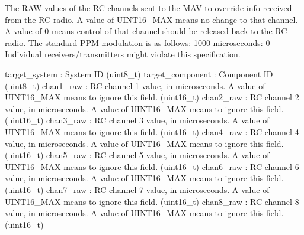 \begin{DoxyVerb}
\begin{DoxyVerb}
\begin{DoxyVerb}
\begin{DoxyVerb}
\begin{DoxyVerb}
\begin{DoxyVerb}The RAW values of the RC channels sent to the MAV to override info
received from the RC radio. A value of UINT16_MAX
means no change to that channel. A value of 0 means
control of that channel should be released back to the
RC radio. The standard PPM modulation is as follows:
1000 microseconds: 0%
Individual receivers/transmitters might violate this
specification.

target_system             : System ID (uint8_t)
target_component          : Component ID (uint8_t)
chan1_raw                 : RC channel 1 value, in microseconds. A value of UINT16_MAX means to ignore this field. (uint16_t)
chan2_raw                 : RC channel 2 value, in microseconds. A value of UINT16_MAX means to ignore this field. (uint16_t)
chan3_raw                 : RC channel 3 value, in microseconds. A value of UINT16_MAX means to ignore this field. (uint16_t)
chan4_raw                 : RC channel 4 value, in microseconds. A value of UINT16_MAX means to ignore this field. (uint16_t)
chan5_raw                 : RC channel 5 value, in microseconds. A value of UINT16_MAX means to ignore this field. (uint16_t)
chan6_raw                 : RC channel 6 value, in microseconds. A value of UINT16_MAX means to ignore this field. (uint16_t)
chan7_raw                 : RC channel 7 value, in microseconds. A value of UINT16_MAX means to ignore this field. (uint16_t)
chan8_raw                 : RC channel 8 value, in microseconds. A value of UINT16_MAX means to ignore this field. (uint16_t)\end{DoxyVerb}
 \mbox{\label{classpymavlink_1_1dialects_1_1v10_1_1MAVLink_a55de8bf4725245df29943c1fd3c066db}} 

\end{DoxyVerb}
\end{DoxyVerb}
\end{DoxyVerb}
\end{DoxyVerb}
\end{DoxyVerb}
